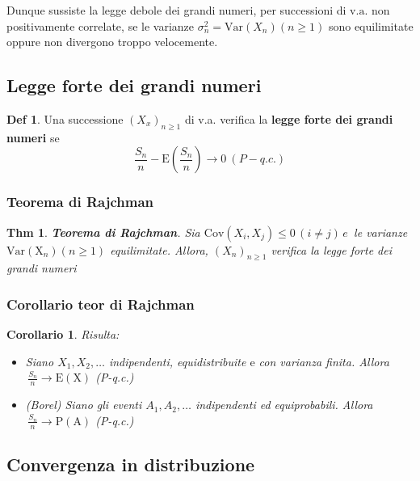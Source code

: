 \documentclass[a4paper,11pt]{article}
\theoremstyle{plain}
\newtheorem{thm}{Thm}[section]
\newtheorem*{cor}{Corollario}
\theoremstyle{definition}
\newtheorem{defn}{Def}[section]
\theoremstyle{remark}
\begin{document}
\noindent
Dunque sussiste la legge debole dei grandi numeri, per successioni di $\mathrm{v}.\mathrm{a}.$ non positivamente correlate, se le varianze $\sigma_{n}^{2}=\mathrm{V}\mathrm{a}\mathrm{r}(X_{n}) (n\geq 1)$ sono equilimitate oppure non divergono troppo velocemente.

\subsection{Legge forte dei grandi numeri}
\begin{defn}
Una successione $(X_{x})_{n\geq 1}$ di v.a. verifica la \textbf{legge forte dei grandi numeri} se
$$\displaystyle \frac{S_{n}}{n}-\mathrm{E}\left(\frac{S_{n}}{n}\right)\rightarrow 0 \ (P-q.c.)$$ 
\end{defn}

\subsubsection{Teorema di Rajchman}
\begin{thm}\textbf{Teorema di Rajchman}.
 Sia $\mathrm{C}\mathrm{o}\mathrm{v}(X_{i}, X_{j})\leq 0 \, (i\neq j)\, e \,$ le varianze $\mathrm{V}\mathrm{a}\mathrm{r}(\mathrm{X}_n) (n\geq 1)$ equilimitate. Allora, $(X_{n})_{n\geq 1}$ verifica la legge forte dei grandi numeri
\end{thm}

\subsubsection{Corollario teor di Rajchman}
\begin{cor} Risulta:
\begin{itemize}
\item [i)] [dim] Siano $X_{1}, X_{2}, \ldots$ indipendenti, equidistribuite $\mathrm{e}$ con varianza finita. Allora $\, \displaystyle \frac{S_{n}}{n}\rightarrow \mathrm{E}(\mathrm{X})$ (P-q.c.)

\item [ii)] (Borel) Siano gli eventi $A_{1}, A_{2}, \ldots$ indipendenti ed equiprobabili. Allora $\, \displaystyle \frac{S_{n}}{n}\rightarrow \mathrm{P}(\mathrm{A})$ (P-q.c.) 
\end{itemize}
\end{cor}

\subsection{Convergenza in distribuzione}
\end{document}
